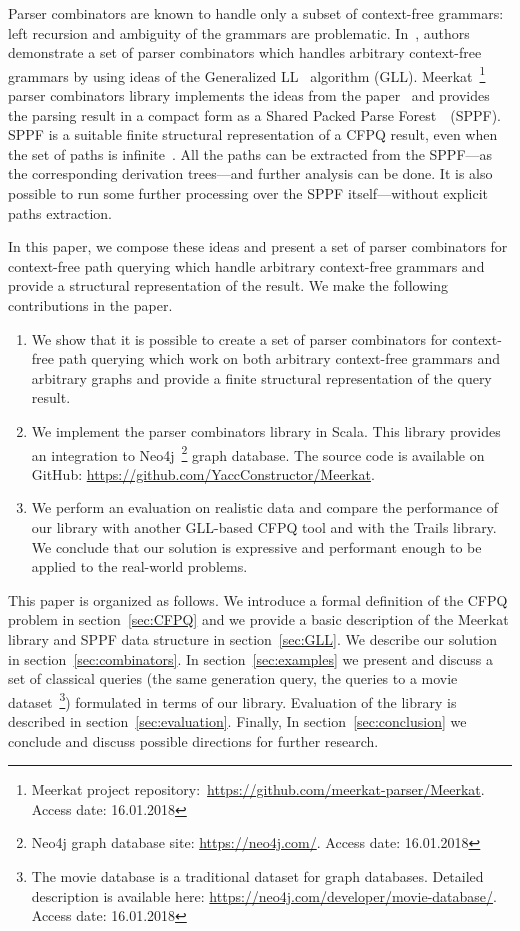 Parser combinators are known to handle only a subset of context-free grammars: left recursion and ambiguity of the grammars are problematic.
In~\cite{Meerkat}, authors demonstrate a set of parser combinators which handles arbitrary context-free grammars by using ideas of the Generalized LL~\cite{scott2010gll} algorithm (GLL).
Meerkat~\footnote{Meerkat project repository:~\url{https://github.com/meerkat-parser/Meerkat}. Access date: 16.01.2018} parser combinators library implements the ideas from the paper~\cite{Meerkat} and provides the parsing result in a compact form as a Shared Packed Parse Forest~\cite{SPPF}~(SPPF).
SPPF is a suitable finite structural representation of a CFPQ result, even when the set of paths is infinite~\cite{GrigorevR16}.
All the paths can be extracted from the SPPF---as the corresponding derivation trees---and further analysis can be done.
It is also possible to run some further processing over the SPPF itself---without explicit paths extraction.

In this paper, we compose these ideas and present a set of parser combinators for context-free path querying which handle arbitrary context-free grammars and provide a structural representation of the result.
We make the following contributions in the paper.

\begin{enumerate}
\item We show that it is possible to create a set of parser combinators for context-free path querying which work on both arbitrary context-free grammars and arbitrary graphs and provide a finite structural representation of the query result.
\item We implement the parser combinators library in Scala. This library provides an integration to Neo4j~\footnote{Neo4j graph database site: \url{https://neo4j.com/}. Access date: 16.01.2018} graph database. The source code is available on GitHub: \url{https://github.com/YaccConstructor/Meerkat}.
\item We perform an evaluation on realistic data and compare the performance of our library with another GLL-based CFPQ tool and with the Trails library.
We conclude that our solution is expressive and performant enough to be applied to the real-world problems.
\end{enumerate}

This paper is organized as follows.
We introduce a formal definition of the CFPQ problem in section~\ref{sec:CFPQ} and we provide a basic description of the Meerkat library and SPPF data structure in section~\ref{sec:GLL}.
We describe our solution in section~\ref{sec:combinators}.
In section~\ref{sec:examples} we present and discuss a set of classical queries (the same generation query, the queries to a movie dataset~\footnote{The movie database is a traditional dataset for graph databases. Detailed description is available here: \url{https://neo4j.com/developer/movie-database/}. Access date: 16.01.2018})
formulated in terms of our library.
Evaluation of the library is described in section~\ref{sec:evaluation}.
Finally, In section~\ref{sec:conclusion} we conclude and discuss possible directions for further research.
